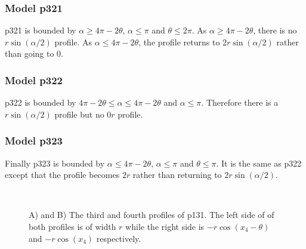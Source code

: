 \subsubsection{Model p321} \label{p321}

p321 is bounded by $\alpha \ge 4\pi - 2\theta$, $\alpha \le \pi$ and $\theta \le 2\pi$. As $\alpha \ge 4\pi - 2\theta$, there is no $r\sin(\alpha/2)$ profile. As $\alpha \le 4\pi - 2\theta$, the profile returns to $2r\sin(\alpha/2)$ rather than going to 0.



\subsubsection{Model p322} \label{p322}

p322 is bounded by $4\pi - 2\theta \le \alpha \le 4\pi - 2\theta$ and $\alpha \le \pi$. Therefore there is a $r\sin(\alpha/2)$ profile but no $0r$ profile.



\subsubsection{Model p323} \label{p323}

Finally p323 is bounded by  $\alpha \le 4\pi - 2\theta $, $\alpha\le\pi$ and $\theta \le \pi$. It is the same as p322 except that the profile becomes $2r$ rather than returning to $2r\sin(\alpha/2)$.




\begin{figure}[t]
        \centering
        \begin{subfigure}[t]{0.3\textwidth}
                \centering
                \caption{}
                \label{f:p131AT}
        \end{subfigure}
~ 
        \begin{subfigure}[t]{0.3\textwidth}
                \centering
                \caption{}
                \label{f:p131behindFull}
        \end{subfigure}
\caption{A) and B) The third and fourth profiles of p131. The left side of of both profiles is of width $r$ while the right side is $- r\cos(x_4 - \theta)$ and $- r\cos(x_4)$ respectively. }
\label{f:p131}
\end{figure}

